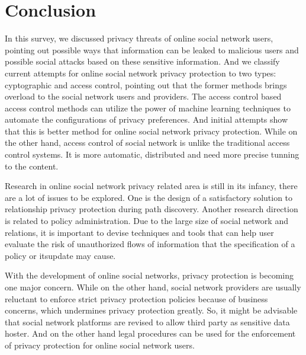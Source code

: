 \documentclass[12pt]{article}
\begin{document}
\section{Conclusion \label{sec:summary}}
In this survey, we discussed privacy threats of online social network
users, pointing out possible ways that information can be leaked to
malicious users and possible social attacks based on these sensitive
information. And we classify current attempts for online social
network privacy protection to two types: cyptographic and access
control, pointing out that the former methods brings overload to the
social network users and providers. The access control based access
control methods can utilize the power of machine learning techniques
to automate the configurations of privacy preferences. And initial
attempts show that this is better method for online social network
privacy protection. While on the other hand, access control of social
network is unlike the traditional access control systems. It is more
automatic, distributed and need more precise tunning to the content. 

Research in online social network privacy related area is still in its
infancy, there are a lot of issues to be explored. One is the design
of a satisfactory solution to relationship privacy protection during
path discovery. Another research direction is related to policy
administration. Due to the large size of social network and relations,
it is important to devise techniques and tools that can help user
evaluate the risk of unauthorized flows of information that the
specification of a policy or itsupdate may cause.

With the development of online social networks, privacy protection is
becoming one major concern. While on the other hand, social network
providers are usually reluctant to enforce strict privacy protection
policies because of business concerns, which undermines privacy
protection greatly. So, it might be advisable that social network
platforms are revised to allow third party as sensitive data
hoster. And on the other hand legal procedures can be used for the
enforcement of privacy protection for online social network users. 



\end{document}

